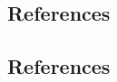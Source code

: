 \documentclass[dissertation, figuresright]{uathesis}
\begin{document}
\begin{refsection} %

\newpage
\section{References}
\begin{singlespace}
\printbibliography[heading=none] %
\end{singlespace}
\end{refsection}



\begin{refsection} %

\newpage
\section{References}
\begin{singlespace}
\printbibliography[heading=none] %
\end{singlespace}
\end{refsection}
\end{document}
